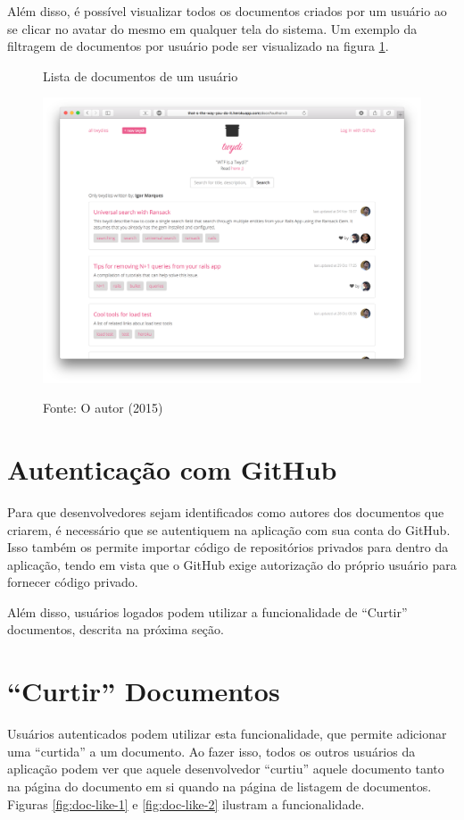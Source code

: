 Além disso, é possível visualizar todos os documentos criados por um usuário ao se clicar no avatar do mesmo em qualquer tela do sistema. Um exemplo da filtragem de documentos por usuário pode ser visualizado na figura \ref{fig:doc-by-user}.

\begin{figure}[h]
	\centering
    \caption{Lista de documentos de um usuário}
    \includegraphics[width=15cm]{Imagens/print-by-user.png}
		\label{fig:doc-by-user}
	\caption*{Fonte: O autor (2015)}
\end{figure}

\section{Autenticação com GitHub}

Para que desenvolvedores sejam identificados como autores dos documentos que criarem, é necessário que se autentiquem na aplicação com sua conta do GitHub. Isso também os permite importar código de repositórios privados para dentro da aplicação, tendo em vista que o GitHub exige autorização do próprio usuário para fornecer código privado.

Além disso, usuários logados podem utilizar a funcionalidade de ``Curtir'' documentos, descrita na próxima seção.

\section{``Curtir'' Documentos}

Usuários autenticados podem utilizar esta funcionalidade, que permite adicionar uma ``curtida'' a um documento. Ao fazer isso, todos os outros usuários da aplicação podem ver que aquele desenvolvedor ``curtiu'' aquele documento tanto na página do documento em si quando na página de listagem de documentos. Figuras \ref{fig:doc-like-1} e \ref{fig:doc-like-2} ilustram a funcionalidade.

